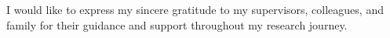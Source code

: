 I would like to express my sincere gratitude to my supervisors, colleagues, and family
for their guidance and support throughout my research journey.
\lipsum[2]
